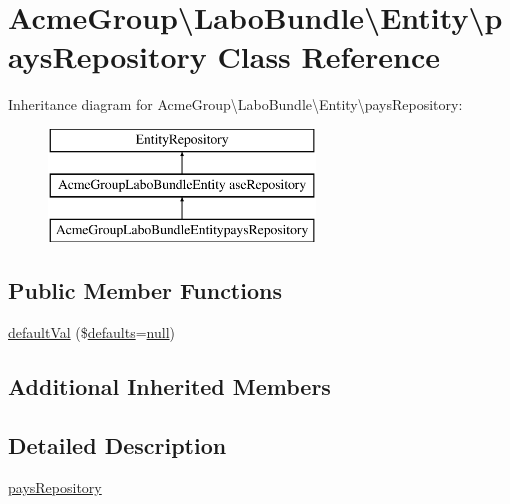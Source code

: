 \hypertarget{class_acme_group_1_1_labo_bundle_1_1_entity_1_1pays_repository}{\section{Acme\+Group\textbackslash{}Labo\+Bundle\textbackslash{}Entity\textbackslash{}pays\+Repository Class Reference}
\label{class_acme_group_1_1_labo_bundle_1_1_entity_1_1pays_repository}
}
Inheritance diagram for Acme\+Group\textbackslash{}Labo\+Bundle\textbackslash{}Entity\textbackslash{}pays\+Repository\+:\begin{figure}[H]
\begin{center}
\leavevmode
\includegraphics[height=3.000000cm]{class_acme_group_1_1_labo_bundle_1_1_entity_1_1pays_repository}
\end{center}
\end{figure}
\subsection*{Public Member Functions}
\begin{DoxyCompactItemize}
\item 
\hyperlink{class_acme_group_1_1_labo_bundle_1_1_entity_1_1pays_repository_a0834fff10d7a53af7094ce59ad74096f}{default\+Val} (\$\hyperlink{model_8defaults_8js_a9114d742403a54e409eca2e2c78bff56}{defaults}=\hyperlink{validate_8js_afb8e110345c45e74478894341ab6b28e}{null})
\end{DoxyCompactItemize}
\subsection*{Additional Inherited Members}


\subsection{Detailed Description}
\hyperlink{class_acme_group_1_1_labo_bundle_1_1_entity_1_1pays_repository}{pays\+Repository}

